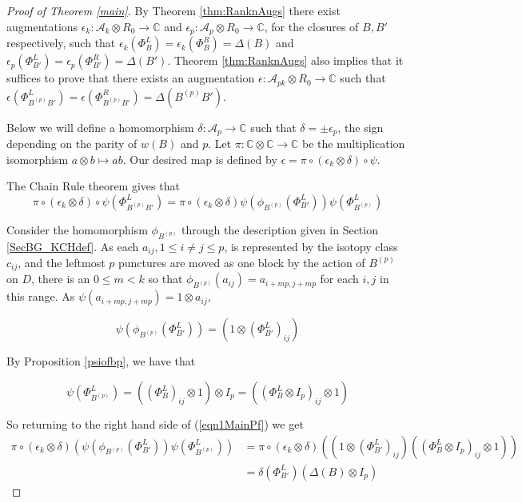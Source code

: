 \documentclass{amsart}[11pt,fullpage]
\def\C{{\mathbb C}}
\def\A{{\mathcal A}}
\theoremstyle{definition}
\begin{document}
\begin{proof}[Proof of Theorem \ref{main}]
By Theorem \ref{thm:RanknAugs} there exist augmentations $\epsilon_k\colon \A_k\otimes R_0 \rightarrow \C$ and $\epsilon_p\colon \A_p\otimes R_0 \rightarrow \C$, for the closures of $B,B'$ respectively, such that $\epsilon_k\left(\Phi_B^L\right) = \epsilon_k\left(\Phi_B^R\right) = \Delta(B)$ and $\epsilon_p\left(\Phi_{B'}^L\right) = \epsilon_p\left(\Phi_{B'}^R\right) = \Delta(B')$. Theorem \ref{thm:RanknAugs} also implies that it suffices to prove that there exists an augmentation $\epsilon\colon \A_{pk}\otimes R_0\rightarrow \C$ such that $\epsilon\left(\Phi_{B^{(p)}B'}^L\right) = \epsilon\left(\Phi_{B^{(p)}B'}^R\right) = \Delta(B^{(p)}B')$.

Below we will define a homomorphism $\delta\colon\A_p\rightarrow \C$ such that $\delta = \pm \epsilon_p$, the sign depending on the parity of $w(B)$ and $p$. Let $\pi\colon \C\otimes \C \rightarrow \C$ be the multiplication isomorphism $a\otimes b\mapsto ab$. Our desired map is defined by $\epsilon = \pi\circ(\epsilon_k\otimes\delta)\circ\psi$.

The Chain Rule theorem gives that
\begin{equation}
\pi\circ(\epsilon_k\otimes\delta)\circ\psi\left(\Phi_{B^{(p)}B'}^L\right) = \pi\circ(\epsilon_k\otimes\delta)\psi\left(\phi_{B^{(p)}}\left(\Phi_{B'}^L\right)\right)\psi\left(\Phi_{B^{(p)}}^L\right)
\label{eqn1MainPf}
\end{equation}

Consider the homomorphism $\phi_{B^{(p)}}$ through the description given in Section \ref{SecBG_KCHdef}. As each $a_{ij}, 1\le i\ne j\le p$, is represented by the isotopy class $c_{ij}$, and the leftmost $p$ punctures are moved as one block by the action of $B^{(p)}$ on $D$, there is an $0\le m<k$ so that $\phi_{B^{(p)}}(a_{ij})=a_{i+mp,j+mp}$ for each $i,j$ in this range. As $\psi(a_{i + mp, j+mp})=1\otimes a_{ij}$,

$$\psi\left(\phi_{B^{(p)}}\left(\Phi_{B'}^L\right)\right) = \left(1\otimes \left(\Phi_{B'}^L\right)_{ij}\right)$$

\noindent By Proposition \ref{psiofbp}, we have that 

$$\psi\left(\Phi_{B^{(p)}}^L\right) = \left(\left(\Phi_B^L\right)_{ij}\otimes 1\right)\otimes I_p = \left(\left(\Phi_B^L\otimes I_p\right)_{ij}\otimes 1\right)$$

\noindent So returning to the right hand side of (\ref{eqn1MainPf}) we get
\begin{align*}
\pi\circ(\epsilon_k\otimes\delta)\left(\psi\left(\phi_{B^{(p)}}\left(\Phi_{B'}^L\right)\right)\psi\left(\Phi_{B^{(p)}}^L\right)\right)
    & = \pi\circ(\epsilon_k\otimes\delta)\left(\left(1\otimes \left(\Phi_{B'}^L\right)_{ij}\right)\left(\left(\Phi_B^L\otimes I_p\right)_{ij}\otimes 1\right)\right)\\
    & = \delta\left(\Phi_{B'}^L\right)\left(\Delta(B)\otimes I_p\right)
\end{align*}



\end{proof}
\end{document}
